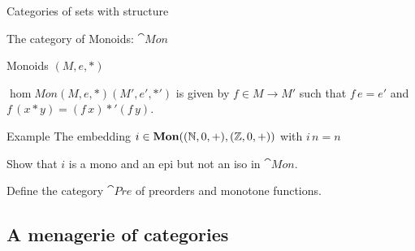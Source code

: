 \documentclass[handout]{beamer}
\begin{document}
\begin{frame}{Categories of sets with structure}

  \begin{block}{The category of Monoids: $\cat{Mon}$}
    \begin{description}
    \item<+->[Objects:] Monoids $(M,e,*)$

    \item<+->[Morphisms] $\hom{Mon}{(M,e,*)}{(M',e',*')}$ is given 
      by $f\in M \to M'$ such that $f\,e = e'$ and 
      $f\,(x * y) = (f\,x) *' (f\,y)$.

    \end{description}
    \end{block}
    
    \pause
    \begin{block}{Example}
      The embedding $i \in \mathbf{Mon}((\mathbb{N},0,+),(\mathbb{Z},0,+))$
      with $i\,n = n$
    \end{block}
  
    \pause
    \begin{exercise}
      Show that $i$ is a mono and an epi but not an iso in $\cat{Mon}$.
    \end{exercise}

    \begin{exercise}
      Define the category $\cat{Pre}$ of preorders and monotone functions.
    \end{exercise}

    
\end{frame}

\subsection{A menagerie of categories}
\end{document}
